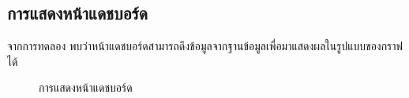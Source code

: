 \subsection{การแสดงหน้าแดชบอร์ด}
จากการทดลอง พบว่าหน้าแดชบอร์ดสามารถดึงข้อมูลจากฐานข้อมูลเพื่อมาแสดงผลในรูปแบบของกราฟได้
\begin{figure}[H]
    \begin{center}
    \end{center}
    \caption[ผลทดลองการแสดงหน้าแดชบอร์ด]{การแสดงหน้าแดชบอร์ด}
    \label{fig:score-section-2}
\end{figure}
